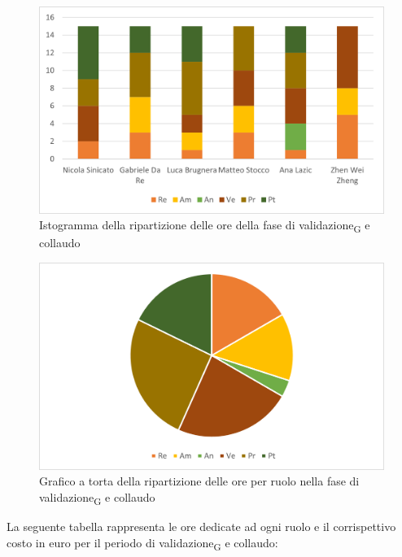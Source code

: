 \begin{figure}[H]
    \centering
    \includegraphics[scale=0.6]{img/grafi preventivo/istogrammi/validazione/complessivo.png}
    \caption{Istogramma della ripartizione delle ore della fase di validazione\textsubscript{G} e collaudo}
\end{figure}
\begin{figure}[H]
    \centering
    \includegraphics[scale=0.6]{img/grafi preventivo/torta/validazione/complessivo.png}
    \caption{Grafico a torta della ripartizione delle ore per ruolo nella fase di validazione\textsubscript{G} e collaudo}
\end{figure}
La seguente tabella rappresenta le ore dedicate ad ogni ruolo e il corrispettivo costo in euro per il periodo di validazione\textsubscript{G} e collaudo:

